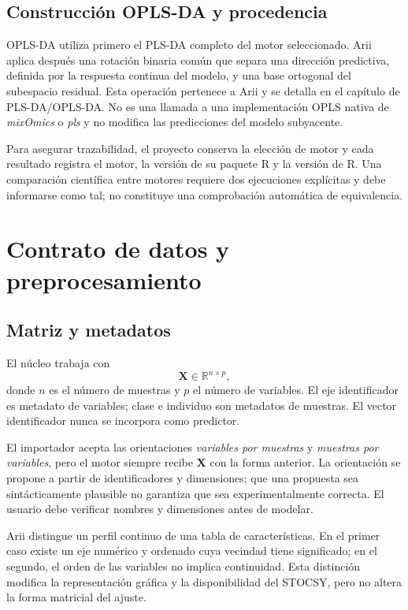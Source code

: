 \documentclass[11pt,a4paper,openany]{report}
\newcommand{\mixOmics}{\textit{mixOmics}}
\newcommand{\plsPkg}{\textit{pls}}
\newcommand{\vect}[1]{\boldsymbol{#1}}
\begin{document}
\section{Construcción OPLS-DA y procedencia}

OPLS-DA utiliza primero el PLS-DA completo del motor seleccionado. Arii aplica después una rotación binaria común que separa una dirección predictiva, definida por la respuesta continua del modelo, y una base ortogonal del subespacio residual. Esta operación pertenece a Arii y se detalla en el capítulo de PLS-DA/OPLS-DA. No es una llamada a una implementación OPLS nativa de \mixOmics{} o \plsPkg{} y no modifica las predicciones del modelo subyacente.

Para asegurar trazabilidad, el proyecto conserva la elección de motor y cada resultado registra el motor, la versión de su paquete R y la versión de R. Una comparación científica entre motores requiere dos ejecuciones explícitas y debe informarse como tal; no constituye una comprobación automática de equivalencia.

\chapter{Contrato de datos y preprocesamiento}
\section{Matriz y metadatos}
El núcleo trabaja con
\begin{equation}
  \vect{X}\in\mathbb{R}^{n\times p},
\end{equation}
donde $n$ es el número de muestras y $p$ el número de variables. El eje identificador es metadato de variables; clase e individuo son metadatos de muestras. El vector identificador nunca se incorpora como predictor.

El importador acepta las orientaciones \emph{variables por muestras} y \emph{muestras por variables}, pero el motor siempre recibe $\vect{X}$ con la forma anterior. La orientación se propone a partir de identificadores y dimensiones; que una propuesta sea sintácticamente plausible no garantiza que sea experimentalmente correcta. El usuario debe verificar nombres y dimensiones antes de modelar.

Arii distingue un perfil continuo de una tabla de características. En el primer caso existe un eje numérico y ordenado cuya vecindad tiene significado; en el segundo, el orden de las variables no implica continuidad. Esta distinción modifica la representación gráfica y la disponibilidad del STOCSY, pero no altera la forma matricial del ajuste.
\end{document}
